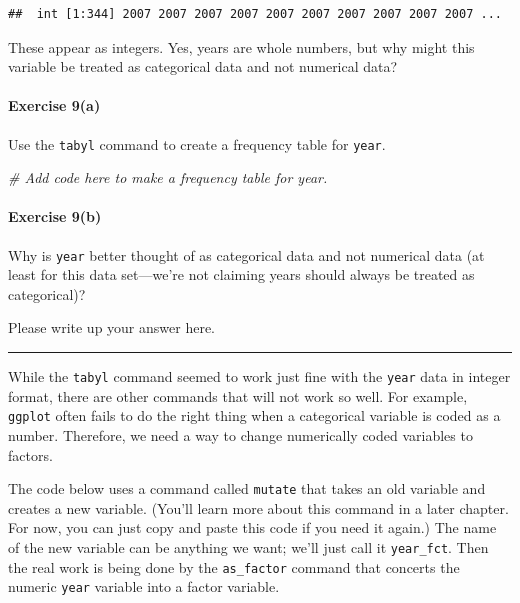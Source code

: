 \documentclass[
]{book}
\newenvironment{Shaded}{\begin{snugshade}}{\end{snugshade}}
\newcommand{\CommentTok}[1]{\textcolor[rgb]{0.56,0.35,0.01}{\textit{#1}}}
\begin{document}
\begin{verbatim}
##  int [1:344] 2007 2007 2007 2007 2007 2007 2007 2007 2007 2007 ...
\end{verbatim}

These appear as integers. Yes, years are whole numbers, but why might this variable be treated as categorical data and not numerical data?

\hypertarget{exercise-9a}{%
\paragraph*{Exercise 9(a)}\label{exercise-9a}}

Use the \texttt{tabyl} command to create a frequency table for \texttt{year}.

\begin{Shaded}
\begin{Highlighting}[]
\CommentTok{\# Add code here to make a frequency table for year.}
\end{Highlighting}
\end{Shaded}

\hypertarget{exercise-9b}{%
\paragraph*{Exercise 9(b)}\label{exercise-9b}}

Why is \texttt{year} better thought of as categorical data and not numerical data (at least for this data set---we're not claiming years should always be treated as categorical)?

Please write up your answer here.

\begin{center}\rule{0.5\linewidth}{0.5pt}\end{center}

While the \texttt{tabyl} command seemed to work just fine with the \texttt{year} data in integer format, there are other commands that will not work so well. For example, \texttt{ggplot} often fails to do the right thing when a categorical variable is coded as a number. Therefore, we need a way to change numerically coded variables to factors.

The code below uses a command called \texttt{mutate} that takes an old variable and creates a new variable. (You'll learn more about this command in a later chapter. For now, you can just copy and paste this code if you need it again.) The name of the new variable can be anything we want; we'll just call it \texttt{year\_fct}. Then the real work is being done by the \texttt{as\_factor} command that concerts the numeric \texttt{year} variable into a factor variable.
\end{document}
